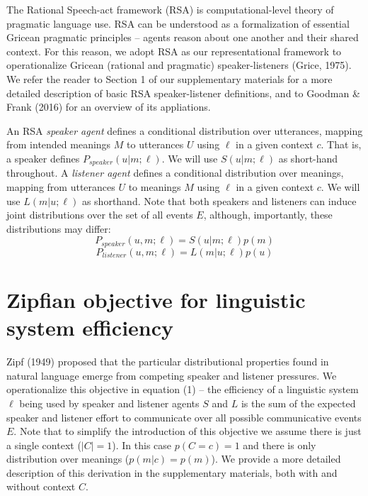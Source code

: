 \documentclass[10pt, letterpaper]{article}
\begin{document}
The Rational Speech-act framework (RSA) is computational-level theory of
pragmatic language use. RSA can be understood as a formalization of
essential Gricean pragmatic principles -- agents reason about one
another and their shared context. For this reason, we adopt RSA as our
representational framework to operationalize Gricean (rational and
pragmatic) speaker-listeners (Grice, 1975). We refer the reader to
Section 1 of our supplementary materials for a more detailed description
of basic RSA speaker-listener definitions, and to Goodman \& Frank
(2016) for an overview of its appliations.\par

An RSA \emph{speaker agent} defines a conditional distribution over
utterances, mapping from intended meanings \(M\) to utterances \(U\)
using \(\ell\) in a given context \(c\). That is, a speaker defines
\(P_{speaker}(u|m; \ell)\). We will use \(S(u|m; \ell)\) as short-hand
throughout. A \emph{listener agent} defines a conditional distribution
over meanings, mapping from utterances \(U\) to meanings \(M\) using
\(\ell\) in a given context \(c\). We will use \(L(m|u; \ell)\) as
shorthand. Note that both speakers and listeners can induce joint
distributions over the set of all events \(E\), although, importantly,
these distributions may differ:
\[P_{speaker}(u, m; \ell) = S(u|m; \ell)p(m)\]
\[P_{listener}(u, m; \ell) = L(m|u; \ell)p(u)\]

\section{Zipfian objective for linguistic system
efficiency}\label{zipfian-objective-for-linguistic-system-efficiency}

Zipf (1949) proposed that the particular distributional properties found
in natural language emerge from competing speaker and listener
pressures. We operationalize this objective in equation (1) -- the
efficiency of a linguistic system \(\ell\) being used by speaker and
listener agents \(S\) and \(L\) is the sum of the expected speaker and
listener effort to communicate over all possible communicative events
\(E\). Note that to simplify the introduction of this objective we
assume there is just a single context (\(|C|=1\)). In this case
\(p(C=c)=1\) and there is only distribution over meanings
(\(p(m|c) = p(m)\)). We provide a more detailed description of this
derivation in the supplementary materials, both with and without context
\(C\).\par
\end{document}
